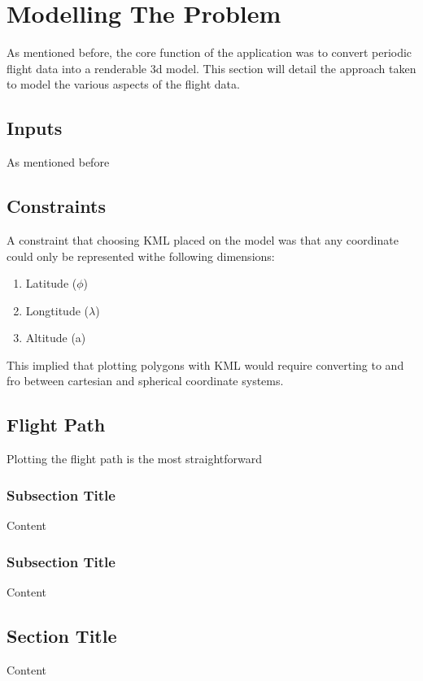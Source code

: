 
\chapter{Modelling The Problem} %

\label{ch:model} %

As mentioned before, the core function of the application was to convert periodic flight data into a
renderable 3d model. This section will detail the approach taken to model the various aspects of the flight data.\\


\section{Inputs}

As mentioned before

\section{Constraints}

A constraint that choosing KML placed on the model was that any coordinate could only be represented withe following dimensions:
\begin{enumerate}
\item Latitude ($\phi$)
\item Longtitude ($\lambda$)
\item Altitude (a)
\end{enumerate}

This implied that plotting polygons with KML would require converting to and fro between cartesian and spherical coordinate systems.

\section{Flight Path}

Plotting the flight path is the most straightforward


\subsection{Subsection Title}

Content


\subsection{Subsection Title}

Content


\section{Section Title}

Content
